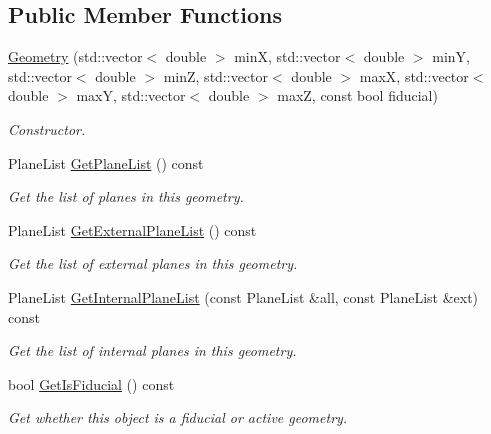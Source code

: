 \subsection*{Public Member Functions}
\begin{DoxyCompactItemize}
\item 
\hypertarget{classcalib_1_1Geometry_a698f1d0a1db5842c756c56309396f419}{\hyperlink{classcalib_1_1Geometry_a698f1d0a1db5842c756c56309396f419}{Geometry} (std\-::vector$<$ double $>$ min\-X, std\-::vector$<$ double $>$ min\-Y, std\-::vector$<$ double $>$ min\-Z, std\-::vector$<$ double $>$ max\-X, std\-::vector$<$ double $>$ max\-Y, std\-::vector$<$ double $>$ max\-Z, const bool fiducial)}\label{classcalib_1_1Geometry_a698f1d0a1db5842c756c56309396f419}

\begin{DoxyCompactList}\small\item\em Constructor. \end{DoxyCompactList}\item 
Plane\-List \hyperlink{classcalib_1_1Geometry_a87e42e5c2630ce89fc71d2bbc856b004}{Get\-Plane\-List} () const 
\begin{DoxyCompactList}\small\item\em Get the list of planes in this geometry. \end{DoxyCompactList}\item 
Plane\-List \hyperlink{classcalib_1_1Geometry_a02298a8777942b97a457eeeb561bb403}{Get\-External\-Plane\-List} () const 
\begin{DoxyCompactList}\small\item\em Get the list of external planes in this geometry. \end{DoxyCompactList}\item 
Plane\-List \hyperlink{classcalib_1_1Geometry_a7a60f6a38ecee567a5fea597407cb788}{Get\-Internal\-Plane\-List} (const Plane\-List \&all, const Plane\-List \&ext) const 
\begin{DoxyCompactList}\small\item\em Get the list of internal planes in this geometry. \end{DoxyCompactList}\item 
bool \hyperlink{classcalib_1_1Geometry_a3cb5182aa01c97e053736f01bb331366}{Get\-Is\-Fiducial} () const 
\begin{DoxyCompactList}\small\item\em Get whether this object is a fiducial or active geometry. \end{DoxyCompactList}\item 

\end{DoxyCompactItemize}
